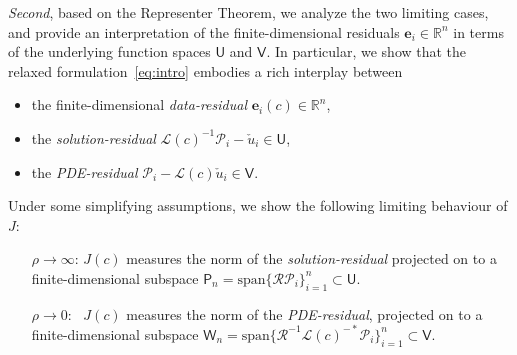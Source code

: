 \documentclass[12pt]{amsart}
\begin{document}
\emph{Second}, based on the Representer Theorem, we analyze the two limiting cases, and provide an interpretation of the finite-dimensional residuals $\mathbf{e}_i\in\mathbb{R}^n$ in terms of the underlying function spaces $\mathsf{U}$ and $\mathsf{V}$. In particular, we show that the relaxed formulation~\eqref{eq:intro} embodies a rich interplay between
\begin{itemize}
    \item the finite-dimensional \emph{data-residual} $\mathbf{e}_i(c)\in \mathbb{R}^n$,
    \item the \emph{solution-residual} $\mathcal{L}(c)^{-1}\mathcal{P}_i - \check{u}_i \in \mathsf{U}$,
    \item the \emph{PDE-residual}  $\mathcal{P}_i - \mathcal{L}(c)\check{u}_i \in \mathsf{V}$.
\end{itemize}
Under some simplifying assumptions, we show the following limiting behaviour of $J$:
\begin{itemize}
\item[$\rho\rightarrow \infty$:] $J(c)$ measures the norm of the \emph{solution-residual} projected on to a finite-dimensional subspace $\mathsf{P}_n = \text{span}\{\mathcal{R}\mathcal{P}_i\}_{i=1}^n \subset \mathsf{U}$.
 
\item[$\rho\rightarrow 0$:\,\,\,] $J(c)$ measures the norm of the \emph{PDE-residual}, projected on to a finite-dimensional subspace $\mathsf{W}_n = \text{span}\{\mathcal{R}^{-1}\mathcal{L}(c)^{-*}\mathcal{P}_i\}_{i=1}^n \subset \mathsf{V}$.
\end{itemize}
\end{document}
